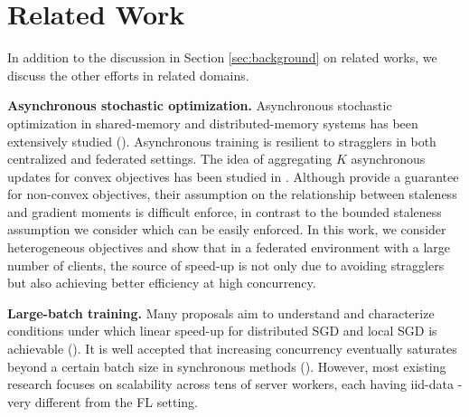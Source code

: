 \documentclass[twoside]{article}
\newcommand{\kshitiz}[1]{\todo[color=red!20,size=\footnotesize,inline,caption={}]{KM: #1}{}}
\newcommand{\concurrency}{{concurrency}\xspace}
\begin{document}
%


\section{Related Work}
\label{sec:related}
In addition to the discussion in Section \ref{sec:background} on related works, we discuss the other efforts in related domains.

\textbf{Asynchronous stochastic optimization. }
Asynchronous stochastic optimization in shared-memory and distributed-memory systems has been extensively studied (\cite{bertsekasTsitsiklis, Duchi_AsyncSGD_convex, hogwild, lian2015asynchronous_nonconvex, lian2018asynchronous, Revisit_dist_SGD_google, AsyncSGDDelay, AsyncSGD_purturbed, leblond17a_ASAGA, reddi2015_ASVRG, advance_async_Mike}). Asynchronous training is resilient to stragglers in both centralized and federated settings. The idea of aggregating $K$ asynchronous updates for convex objectives has been studied in \citep{dutta2018slow}. Although \citet{dutta2020slow} provide a guarantee for non-convex objectives, their assumption on the relationship between staleness and gradient moments is difficult enforce, in contrast to the bounded staleness assumption we consider which can be easily enforced. In this work, we consider heterogeneous objectives and show that in a federated environment with a large number of clients, the source of speed-up is not only due to avoiding stragglers but also achieving better efficiency at high concurrency.
 
\textbf{Large-batch training. }
Many proposals aim to understand and characterize conditions under which linear speed-up for distributed SGD and local SGD is achievable (\cite{dont_use_minibatch, yu2019linear, is_local_sgd_better, adaptive_sync_localSGD}). It is well accepted that increasing \concurrency{} eventually saturates beyond a certain batch size in synchronous methods (\cite{gradient-diversity, scaling_nmt, imagenet-1hr, scaling_nmt, bert_in_76, imagenet_minutes, lars, measuring_data_parallelism}). However, most existing research focuses on scalability across tens of server workers, each having iid-data - very different from the FL setting.

\end{document}
